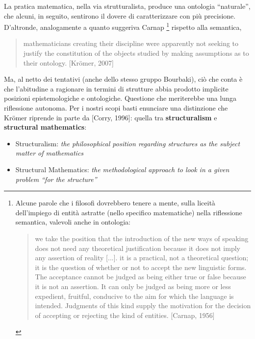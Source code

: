	
	La pratica matematica, nella via strutturalista, produce una ontologia ``naturale'', che alcuni, in seguito, sentirono il dovere di caratterizzare con più precisione. D'altronde, analogamente a quanto suggeriva Carnap \footnote{Alcune parole che i filosofi dovrebbero tenere a mente, sulla liceità dell'impiego di entità astratte (nello specifico matematiche) nella riflessione semantica, valevoli anche in ontologia:
	\begin{quote}
		we take the position that
		the introduction of the new ways of speaking does not need any theoretical justification
		because it does not imply any assertion of reality [...].  it is a
		practical, not a theoretical question; it is the question of whether or not to accept the new
		linguistic forms. The acceptance cannot be judged as being either true or false because it is
		not an assertion. It can only be judged as being more or less expedient, fruitful, conducive to
		the aim for which the language is intended. Judgments of this kind supply the motivation for
		the decision of accepting or rejecting the kind of entities. [Carnap, 1956]
\end{quote}} rispetto alla semantica,
\begin{quotation}
	mathematicians creating
	their discipline were apparently not seeking to justify the constitution of the
	objects studied by making assumptions as to their ontology. [Kr\"omer, 2007]
\end{quotation}
Ma, al netto dei tentativi (anche dello stesso gruppo Bourbaki), ciò che conta è che l'abitudine a ragionare in termini di strutture abbia prodotto implicite posizioni epistemologiche e ontologiche.
Questione che meriterebbe una lunga riflessione autonoma. Per i nostri scopi basti enunciare una distinzione che Kr\"omer riprende in parte da [Corry, 1996]: quella tra \textbf{structuralism} e \textbf{structural mathematics}:
\begin{itemize}
	\item[\textbf{(1)}] Structuralism: \textit{the philosophical
		position regarding structures as the subject matter of mathematics}
	\item[\textbf{(2)}] Structural Mathematics: \textit{the methodological approach to look in a given problem
		“for the structure”}
\end{itemize}
